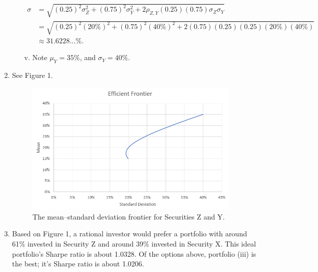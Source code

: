 \documentclass[12pt]{article}
\begin{document}
\begin{enumerate}
\begin{enumerate}
        \begin{align*}
        \sigma
        &=\sqrt{(0.25)^2\sigma_Z^2+(0.75)^2\sigma_Y^2+2\rho_{Z,Y}(0.25)(0.75)\sigma_Z\sigma_Y}\\
        &=\sqrt{(0.25)^2(20\%)^2+(0.75)^2(40\%)^2+2(0.75)(0.25)(0.25)(20\%)(40\%)}\\
        &\approx 31.6228\dots\%.
        \end{align*}
        \item[v.] Note $\mu_Y=35\%$, and $\sigma_Y=40\%$.
    \end{enumerate}
    \item See Figure 1.
    \begin{figure}[h]
    \begin{center}
    \includegraphics[width=4in]{images/efficient-frontier.png}
    \end{center}
    \caption{The mean--standard deviation frontier for Securities Z and Y.\label{fig:ios}}
    \end{figure}
    \item Based on Figure 1, a rational investor would prefer a portfolio with around 61\% invested in Security Z and around 39\% invested in Security X. This ideal portfolio's Sharpe ratio is about 1.0328. Of the options above, portfolio (iii) is the best; it's Sharpe ratio is about 1.0206.
\end{enumerate}
\end{document}
